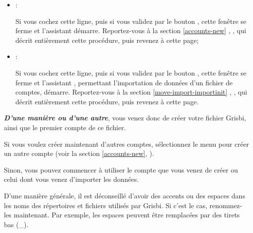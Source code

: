\begin{enumerate}
		\begin{itemize}
			\item[\textopenbullet] :\par
			Si vous cochez cette ligne, puis si vous validez par le bouton , cette fenêtre se ferme et l'assistant  démarre. Reportez-vous à la section \vref{accounts-new}%
			, , qui décrit entièrement cette procédure, puis revenez à cette page;

			\item[\textopenbullet] :\par
			Si vous cochez cette ligne, puis si vous validez par le bouton , cette fenêtre se ferme et l'assistant , permettant l'importation de données d'un fichier de comptes, démarre. Reportez-vous à la section \vref{move-import-importinit}%
			, , qui décrit entièrement cette procédure, puis revenez à cette page.
		\end{itemize}
\end{enumerate}

\label{start-newfile-end}

\textit{\textbf{D'une manière ou d'une autre}}, vous venez donc de créer votre fichier Grisbi, ainsi que le premier compte de ce fichier. 

Si vous voulez créer maintenant d'autres comptes, sélectionnez le menu  pour créer un autre compte (voir la section \vref{accounts-new}, ).

Sinon, vous pouvez commencer à utiliser le compte que vous venez de créer ou celui dont vous venez d'importer les données.

D'une manière générale, il est déconseillé d'avoir des accents ou des espaces dans les noms des répertoires et fichiers utilisés par Grisbi. Si c'est le cas, renommez-les maintenant. Par exemple, les espaces peuvent être remplacées par des tirets bas (\_).

